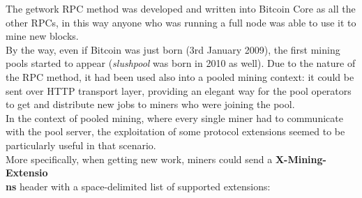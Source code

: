 The getwork RPC method was developed and written into Bitcoin Core as all the other RPCs, in this way anyone who was running a full node was able to use it to mine new blocks.\\
By the way, even if Bitcoin was just born (3rd January 2009), the first mining pools started to appear (\textit{slushpool} was born in 2010 as well). Due to the nature of the RPC method, it had been used also into a pooled mining context: it could be sent over HTTP transport layer, providing an elegant way for the pool operators to get and distribute new jobs to miners who were joining the pool.\\
In the context of pooled mining, where every single miner had to communicate with the pool server, the exploitation of some protocol extensions seemed to be particularly useful in that scenario.\cite{bitcoinGetworkBitcoin}\\
More specifically, when getting new work, miners could send a \textbf{X-Mining-Extensio\\ns} header with a space-delimited list of supported extensions:
